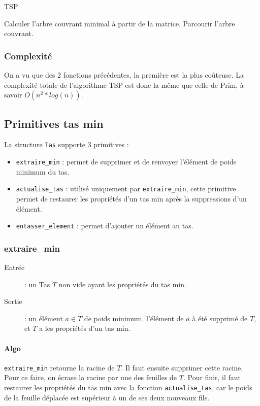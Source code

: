 \documentclass[a4paper,11pt]{article}
\begin{document}
\begin{algorithm}
\caption{TSP}
\begin{algorithmic}[1]

\STATE Calculer l'arbre couvrant minimal à partir de la matrice.
\STATE Parcourir l'arbre couvrant.

\end{algorithmic}
\end{algorithm}

\subsubsection*{Complexité}
On a vu que des 2 fonctions précédentes, la première est la plus coûteuse.
La complexité totale de l'algorithme TSP est donc la même que celle de Prim, à savoir $O(n^2*log(n))$.

\subsection{Primitives tas min} %
La structure \texttt{Tas} supporte 3 primitives :
\begin{itemize}
\item \texttt{extraire\_min} : permet de supprimer et de renvoyer l’élément de poids minimum du tas.
\item \texttt{actualise\_tas} : utilisé uniquement par \texttt{extraire\_min}, cette primitive permet de restaurer les propriétés d'un tas min après la suppressions d'un élément.
\item \texttt{entasser\_element} : permet d'ajouter un élément au tas.
\end{itemize}
\subsubsection*{extraire\_min}
\begin{description}
\item[Entrée] : un \textsf{Tas} $T$ non vide ayant les propriétés du tas min.
\item[Sortie] : un élément $a \in T$ de poids minimum. l'élément de $a$ à été supprimé de $T$, et $T$ a les propriétés d'un tas min.
\end{description}
\paragraph*{Algo}
\texttt{extraire\_min} retourne la racine de $T$. Il faut ensuite supprimer cette racine. Pour ce faire, on écrase la racine par une des feuilles de $T$. Pour finir, il faut restaurer les propriétés du tas min avec la fonction \texttt{actualise\_tas}, car le poids de la feuille déplacée est supérieur à un de ses deux nouveaux fils.
\end{document}
